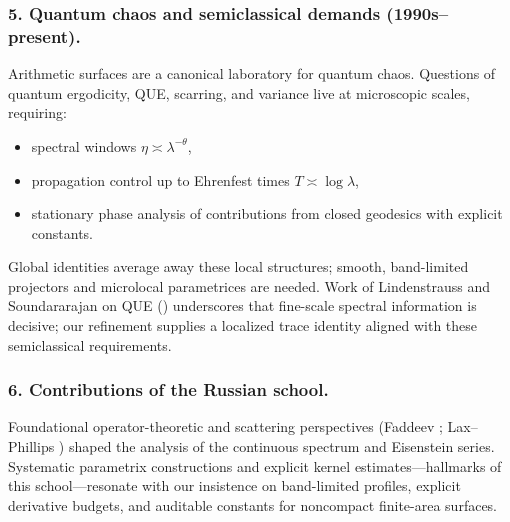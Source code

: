 \subsubsection*{5. Quantum chaos and semiclassical demands (1990s–present).}
Arithmetic surfaces are a canonical laboratory for quantum chaos. Questions of quantum ergodicity, QUE, scarring, and variance
live at microscopic scales, requiring:
\begin{itemize}
  \item spectral windows $\eta\asymp\lambda^{-\theta}$,
  \item propagation control up to Ehrenfest times $T\asymp\log\lambda$,
  \item stationary phase analysis of contributions from closed geodesics with explicit constants.
\end{itemize}
Global identities average away these local structures; smooth, band-limited projectors and microlocal parametrices are needed.
Work of Lindenstrauss and Soundararajan on QUE (\cite{LindenstraussQUE,SoundararajanQUE}) underscores that fine-scale spectral
information is decisive; our refinement supplies a localized trace identity aligned with these semiclassical requirements.

\subsubsection*{6. Contributions of the Russian school.}
Foundational operator-theoretic and scattering perspectives (Faddeev \cite{Faddeev1967}; Lax–Phillips \cite{LaxPhillips1976})
shaped the analysis of the continuous spectrum and Eisenstein series. Systematic parametrix constructions and explicit kernel
estimates—hallmarks of this school—resonate with our insistence on band-limited profiles, explicit derivative budgets, and auditable
constants for noncompact finite-area surfaces.

